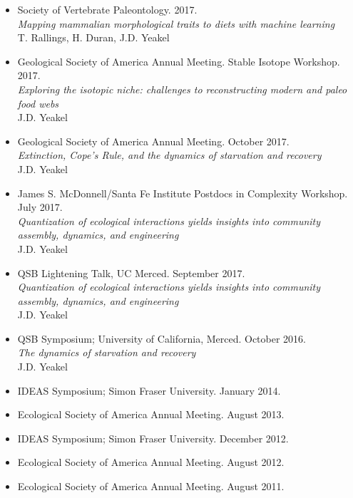 \documentclass[margin,line,12pt]{res}
\begin{document}
\begin{resume}
\begin{itemize}
\item Society of Vertebrate Paleontology. 2017.\\
\emph{Mapping mammalian morphological traits to diets with machine learning}\\
T. Rallings, H. Duran, J.D. Yeakel

\item Geological Society of America Annual Meeting. Stable Isotope Workshop. 2017.\\
\emph{Exploring the isotopic niche: challenges to reconstructing modern and paleo food
webs}\\
J.D. Yeakel

\item Geological Society of America Annual Meeting. October 2017.\\
\emph{Extinction, Cope's Rule, and the dynamics of starvation and recovery}\\
J.D. Yeakel

\item James S. McDonnell/Santa Fe Institute Postdocs in Complexity Workshop. July 2017.\\
\emph{Quantization of ecological interactions yields insights into community assembly, dynamics, and engineering}\\
J.D. Yeakel

\item QSB Lightening Talk, UC Merced. September 2017.\\
\emph{Quantization of ecological interactions yields insights into community assembly, dynamics, and engineering}\\
J.D. Yeakel

\item QSB Symposium; University of California, Merced. October 2016.\\
\emph{The dynamics of starvation and recovery}\\
J.D. Yeakel

\item IDEAS Symposium; Simon Fraser University. January 2014.

\item Ecological Society of America Annual Meeting. August 2013.

\item IDEAS Symposium; Simon Fraser University. December 2012.

\item Ecological Society of America Annual Meeting. August 2012.

\item Ecological Society of America Annual Meeting. August 2011.


\end{itemize}
\end{resume}
\end{document}
